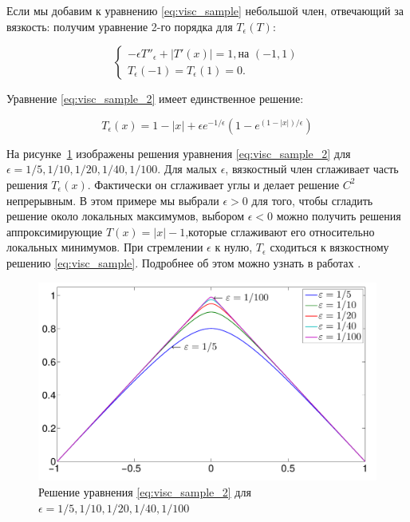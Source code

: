 Если мы добавим к уравнению \eqref{eq:visc_sample} небольшой член,
отвечающий за вязкость: получим уравнение 2-го порядка для
$T_\epsilon(T)$:

\begin{equation}
  \label{eq:visc_sample_2}
  \left\{ \begin{matrix}
      -\epsilon T''_\epsilon+|T'(x)| = 1,\text{на } (-1,1) \\
      T_\epsilon(-1) = T_\epsilon(1) = 0.
    \end{matrix}\right.
\end{equation}

Уравнение \eqref{eq:visc_sample_2} имеет единственное решение:

\begin{equation*}
  T_\epsilon(x) = 1 - |x| + \epsilon e^{-1/\epsilon}(1 - e^{(1-|x|)/\epsilon})
\end{equation*}


На рисунке~\ref{fig:viscosity-experiment} изображены решения уравнения
\eqref{eq:visc_sample_2} для  $\epsilon =
1/5,1/10,1/20,1/40,1/100$. Для малых $\epsilon$, вязкостный член
сглаживает часть решения $T_\epsilon(x)$. Фактически он сглаживает
углы и делает решение $C^2$ непрерывным. В этом примере мы выбрали
$\epsilon >0$ для того, чтобы сгладить решение около локальных максимумов, выбором
$\epsilon <0$ можно получить решения аппроксимирующие $T(x) = |x| -
1$,которые сглаживают его относительно локальных минимумов. При
стремлении $\epsilon$ к нулю, $T_\epsilon$ сходиться к вязкостному
решению \eqref{eq:visc_sample}. Подробнее об этом можно узнать в
работах \cite{V1984,V1983}.


\begin{figure}[h]
  \centering
  \includegraphics[width=\linewidth]{img/viscosity_example.png}
  \hfil \caption{Решение уравнения \eqref{eq:visc_sample_2} для $\epsilon = 1/5, 1/10, 1/20, 1/40, 1/100$}
  \label{fig:viscosity-experiment}

\end{figure}


